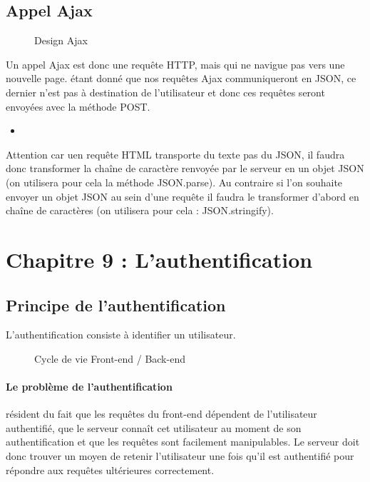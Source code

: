 \documentclass{article}[12pt]
\newcommand{\JavaScript}[2]{
	\begin{itemize}
		\item[]
	\end{itemize}
}
\begin{document}
\subsection{Appel Ajax}
\begin{figure}[H]
	\centering
    \caption{Design Ajax}
\end{figure}
Un appel Ajax est donc une requête HTTP, mais qui ne navigue pas vers une nouvelle page. étant donné que nos requêtes Ajax communiqueront en JSON, ce dernier n'est pas à destination de l'utilisateur et donc ces requêtes seront envoyées avec la méthode POST.
\JavaScript{requete_ajax}{Exemple de requête Ajax}
Attention car uen requête HTML 	transporte du texte pas du JSON, il faudra donc transformer la chaîne de caractère renvoyée par le serveur en un objet JSON (on utilisera pour cela la méthode JSON.parse). Au contraire si l'on souhaite envoyer un objet JSON au sein d'une requête il faudra le transformer d'abord en chaîne de caractères (on utilisera pour cela : JSON.stringify).
\section{Chapitre 9 : L'authentification}
\subsection{Principe de l'authentification}
L'authentification consiste à identifier un utilisateur.
\begin{figure}[H]
	\centering
    \caption{Cycle de vie Front-end / Back-end}
\end{figure}
\paragraph{Le problème de l'authentification} résident du fait que les requêtes du front-end dépendent de l'utilisateur authentifié, que le serveur connaît cet utilisateur au moment de son authentification et que les requêtes sont facilement manipulables. Le serveur doit donc trouver un moyen de retenir l'utilisateur une fois qu'il est authentifié pour répondre aux requêtes ultérieures correctement.
\end{document}
